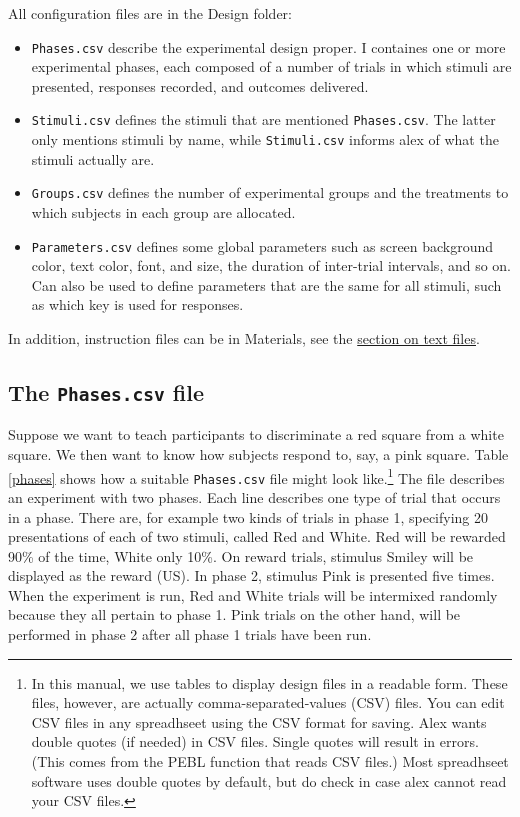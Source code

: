 \documentclass[11pt,]{article}
\begin{document}

All configuration files are in the Design folder:

\begin{itemize}
\item
  \texttt{Phases.csv} describe the experimental design proper. I
  containes one or more experimental phases, each composed of a number
  of trials in which stimuli are presented, responses recorded, and
  outcomes delivered.
\item
  \texttt{Stimuli.csv} defines the stimuli that are mentioned
  \texttt{Phases.csv}. The latter only mentions stimuli by name, while
  \texttt{Stimuli.csv} informs alex of what the stimuli actually are.
\item
  \texttt{Groups.csv} defines the number of experimental groups and the
  treatments to which subjects in each group are allocated.
\item
  \texttt{Parameters.csv} defines some global parameters such as screen
  background color, text color, font, and size, the duration of
  inter-trial intervals, and so on. Can also be used to define
  parameters that are the same for all stimuli, such as which key is
  used for responses.
\end{itemize}

In addition, instruction files can be in Materials, see the
\hyperref[textfiles]{section on text files}.

\subsection{The \texttt{Phases.csv} file}

Suppose we want to teach participants to discriminate a red square from
a white square. We then want to know how subjects respond to, say, a
pink square. Table \ref{phases} shows how a suitable \texttt{Phases.csv}
file might look like.\footnote{In this manual, we use tables to display
  design files in a readable form. These files, however, are actually
  comma-separated-values (CSV) files. You can edit CSV files in any
  spreadhseet using the CSV format for saving. Alex wants double quotes
  (if needed) in CSV files. Single quotes will result in errors. (This
  comes from the PEBL function that reads CSV files.) Most spreadhseet
  software uses double quotes by default, but do check in case alex
  cannot read your CSV files.} The file describes an experiment with two
phases. Each line describes one type of trial that occurs in a phase.
There are, for example two kinds of trials in phase 1, specifying 20
presentations of each of two stimuli, called Red and White. Red will be
rewarded 90\% of the time, White only 10\%. On reward trials, stimulus
Smiley will be displayed as the reward (US). In phase 2, stimulus Pink
is presented five times. When the experiment is run, Red and White
trials will be intermixed randomly because they all pertain to phase 1.
Pink trials on the other hand, will be performed in phase 2 after all
phase 1 trials have been run.
\end{document}
